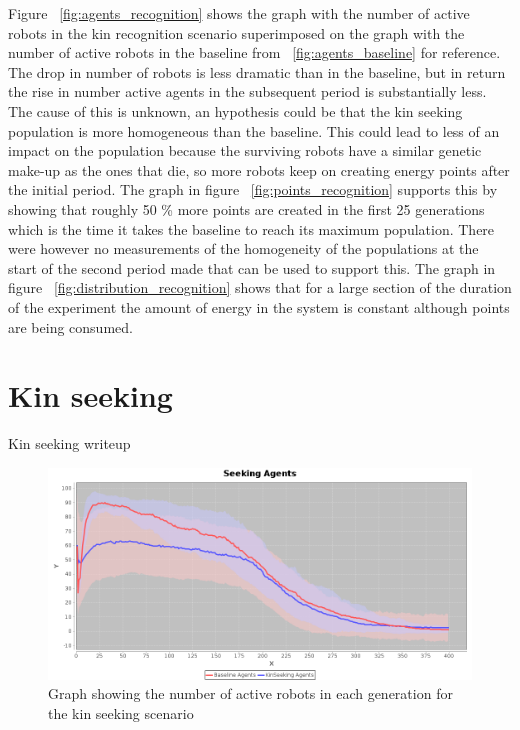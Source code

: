 \documentclass[a4paper]{book}
\begin{document}
Figure ~\ref{fig:agents_recognition} shows the graph with the number of active robots in the kin recognition scenario superimposed on the graph with the number of active robots in the baseline from ~\ref{fig:agents_baseline} for reference. 
The drop in number of robots is less dramatic than in the baseline, but in return the rise in number active agents in the subsequent period is substantially less. 
The cause of this is unknown, an hypothesis could be that the kin seeking population is more homogeneous than the baseline. 
This could lead to less of an impact on the population because the surviving robots have a similar genetic make-up as the ones that die, so more robots keep on creating energy points after the initial period. 
The graph in figure ~\ref{fig:points_recognition} supports this by showing that roughly 50 \% more points are created in the first 25 generations which is the time it takes the baseline to reach its maximum population. 
There were however no measurements of the homogeneity of the populations at the start of the second period made that can be used to support this.
The graph in figure ~\ref{fig:distribution_recognition} shows that for a large section of the duration of the experiment the amount of energy in the system is constant although points are being consumed. 

\section{Kin seeking}

Kin seeking writeup
\begin{figure}
	\includegraphics[width=\textwidth]{expr2/seeking_agents.png}
    \caption{Graph showing the number of active robots in each generation for the kin seeking scenario}
    \label{fig:agents_seeking}
\end{figure}
\end{document}
